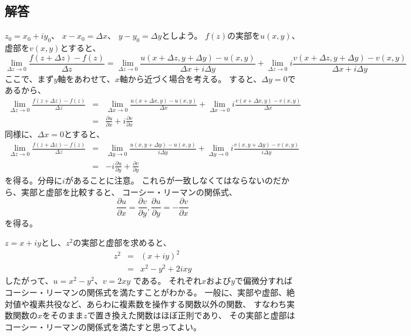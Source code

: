 \subsection{解答}


$z_0 = x_0 + i y_0$、
$x - x_0 = \Delta x$、
$y - y_0 = \Delta y$としよう。
$f(z)$の実部を$u(x,y)$、虚部を$v(x,y)$とすると、
$$
  \lim_{\Delta z \rightarrow 0} \frac{f(z+\Delta z) - f(z)}{\Delta z}
  =
  \lim_{\Delta z \rightarrow 0} \frac{u(x+\Delta z,y+\Delta y) - u(x,y)}{\Delta x + i \Delta y}
  + \lim_{\Delta z \rightarrow 0} i \frac{v(x+\Delta z,y+\Delta y) - v(x,y)}{\Delta x + i \Delta y}
$$
ここで、まず$y$軸をあわせて、$x$軸から近づく場合を考える。
すると、$\Delta y = 0$であるから、
\begin{eqnarray}
  \lim_{\Delta z \rightarrow 0} \frac{f(z+\Delta z) - f(z)}{\Delta z}
  &=&
  \lim_{\Delta x \rightarrow 0} \frac{u(x+\Delta x,y) - u(x,y)}{\Delta x}
  + \lim_{\Delta x \rightarrow 0} i \frac{v(x+\Delta x,y) - v(x,y)}{\Delta x}\\
  &=&
  \frac{\partial u}{\partial x} + i \frac{\partial v}{\partial x}
\end{eqnarray}
同様に、$\Delta x = 0$とすると、
\begin{eqnarray}
  \lim_{\Delta z \rightarrow 0} \frac{f(z+\Delta z) - f(z)}{\Delta z}
  &=&
  \lim_{\Delta y \rightarrow 0} \frac{u(x,y+\Delta y) - u(x,y)}{i\Delta y}
  + \lim_{\Delta y \rightarrow 0} i \frac{v(x,y+\Delta y) - v(x,y)}{i\Delta y}\\
  &=&
  -i \frac{\partial u}{\partial y} + \frac{\partial v}{\partial y}
\end{eqnarray}
を得る。分母に$i$があることに注意。
これらが一致しなくてはならないのだから、実部と虚部を比較すると、
コーシー・リーマンの関係式、
$$
  \frac{\partial u}{\partial x} = \frac{\partial v}{\partial y},
  \frac{\partial u}{\partial y} = -\frac{\partial v}{\partial x}
$$
を得る。


$z = x+ iy$とし、$z^2$の実部と虚部を求めると、
\begin{eqnarray}
  z^2 &=& (x+iy)^2\\
  &=& x^2 - y^2 +  2ixy
\end{eqnarray}
したがって、$u = x^2 - y^2$、$v = 2xy$
である。
それぞれ$x$および$y$で偏微分すればコーシー・リーマンの関係式を満たすことがわかる。
一般に、実部や虚部、絶対値や複素共役など、あらわに複素数を操作する関数以外の関数、
すなわち実数関数の$x$をそのまま$z$で置き換えた関数はほぼ正則であり、
その実部と虚部はコーシー・リーマンの関係式を満たすと思ってよい。

